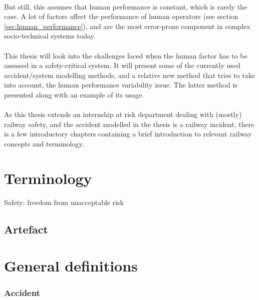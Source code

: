 \\
But still, this assumes that human performance is constant, which is rarely the case. A lot of factors affect the performance of human operators (see section \ref{sec:human_performance}), and are the most error-prone component in complex socio-technical systems today.\\
\\
This thesis will look into the challenges faced when the human factor has to be assessed in a safety-critical system. It will present some of the currently used accident/system modelling methods, and a relative new method that tries to take into account, the human performance variability issue. The latter method is presented along with an example of its usage.\\
\\
As this thesis extends an internship at risk department dealing with (mostly) railway safety, and the accident modelled in the thesis is a railway incident, there is a few introductory chapters containing a brief introduction to relevant railway concepts and terminology.

\section{Terminology}
Safety: freedom from unacceptable risk


\subsection{Artefact}
\section{General definitions}


\subsubsection*{Accident}

